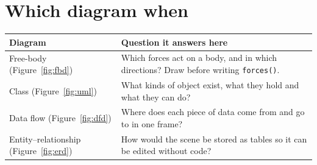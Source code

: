 \section{Which diagram when}
\begin{tabularx}{\linewidth}{@{}lX@{}}
\toprule
Diagram & Question it answers here \\
\midrule
Free-body (Figure~\ref{fig:fbd}) & Which forces act on a body, and in which directions? Draw before writing \texttt{forces()}. \\
Class (Figure~\ref{fig:uml}) & What kinds of object exist, what they hold and what they can do? \\
Data flow (Figure~\ref{fig:dfd}) & Where does each piece of data come from and go to in one frame? \\
Entity--relationship (Figure~\ref{fig:erd}) & How would the scene be stored as tables so it can be edited without code? \\
\bottomrule
\end{tabularx}
